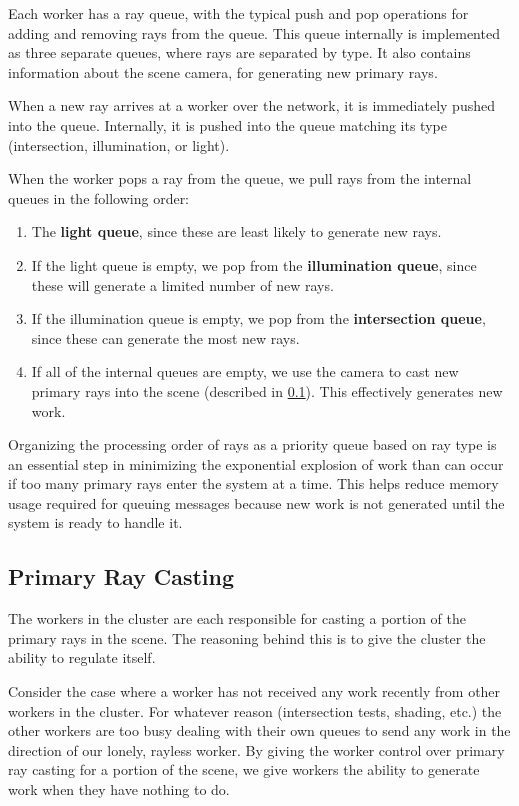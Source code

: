 \documentclass[12pt]{ucthesis}
\begin{document}
Each worker has a ray queue, with the typical push and pop operations for adding
and removing rays from the queue. This queue internally is implemented as three
separate queues, where rays are separated by type. It also contains information
about the scene camera, for generating new primary rays.

When a new ray arrives at a worker over the network, it is immediately pushed
into the queue. Internally, it is pushed into the queue matching its type
(intersection, illumination, or light).

When the worker pops a ray from the queue, we pull rays from the internal
queues in the following order:

\begin{enumerate}
   \item The \textbf{light queue}, since these are least likely to generate
      new rays.
   \item If the light queue is empty, we pop from the \textbf{illumination queue},
      since these will generate a limited number of new rays.
   \item If the illumination queue is empty, we pop from the
      \textbf{intersection queue}, since these can generate the most new rays.
   \item If all of the internal queues are empty, we use the camera to cast
      new primary rays into the scene (described in \ref{primaryrays}). This
      effectively generates new work.
\end{enumerate}

Organizing the processing order of rays as a priority queue based on ray type
is an essential step in minimizing the exponential explosion of work than can
occur if too many primary rays enter the system at a time. This helps reduce
memory usage required for queuing messages because new work is not generated
until the system is ready to handle it.

\subsection{Primary Ray Casting}
\label{primaryrays}

The workers in the cluster are each responsible for casting a portion of the
primary rays in the scene. The reasoning behind this is to give the cluster
the ability to regulate itself.

Consider the case where a worker has not received any work recently from other
workers in the cluster. For whatever reason (intersection tests, shading, etc.)
the other workers are too busy dealing with their own queues to send any work
in the direction of our lonely, rayless worker. By giving the worker control
over primary ray casting for a portion of the scene, we give workers the ability
to generate work when they have nothing to do.
\end{document}
